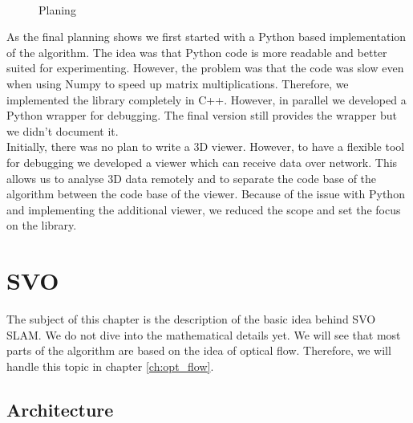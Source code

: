 \documentclass[11pt,a4paper,titlepage,oneside]{report}
\begin{document}
\begin{figure}[H]
  \\
  \caption{Planing}\label{fig:gantt}
\end{figure}

As the final planning shows we first started with a Python based implementation of the algorithm. The idea was that Python code is more readable and better suited for experimenting. However, the problem was that the code was slow even when using Numpy to speed up matrix multiplications. Therefore, we implemented the library completely in C++. However, in parallel we developed a Python wrapper for debugging. The final version still provides the wrapper but we didn't document it.\\
Initially, there was no plan to write a 3D viewer. However, to have a flexible tool for debugging we developed a viewer which can receive data over network. This allows us to analyse 3D data remotely and to separate the code base of the algorithm between the code base of the viewer. Because of the issue with Python and implementing the additional viewer, we reduced the scope and set the focus on the library.

\chapter{SVO}\label{ch:svo}
The subject of this chapter is the description of the basic idea behind SVO SLAM. We do not dive into the mathematical details yet. We will see that most parts of the algorithm are based on the idea of optical flow. Therefore, we will handle this topic in chapter \ref{ch:opt_flow}.

\section{Architecture}
\end{document}
